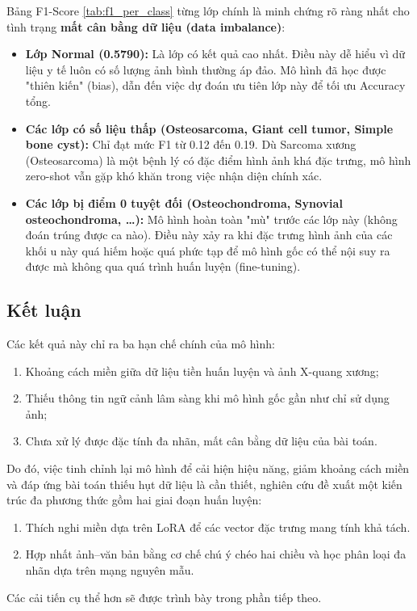 Bảng F1-Score \ref{tab:f1_per_class} từng lớp chính là minh chứng rõ ràng nhất cho tình trạng \textbf{mất cân bằng dữ liệu (data imbalance)}:
\begin{itemize}
    \item \textbf{Lớp Normal (0.5790):} Là lớp có kết quả cao nhất. Điều này dễ hiểu vì dữ liệu y tế luôn có số lượng ảnh bình thường áp đảo. Mô hình đã học được "thiên kiến" (bias), dẫn đến việc dự đoán ưu tiên lớp này để tối ưu Accuracy tổng.
    \item \textbf{Các lớp có số liệu thấp (Osteosarcoma, Giant cell tumor, Simple bone cyst):} Chỉ đạt mức F1 từ 0.12 đến 0.19. Dù Sarcoma xương (Osteosarcoma) là một bệnh lý có đặc điểm hình ảnh khá đặc trưng, mô hình zero-shot vẫn gặp khó khăn trong việc nhận diện chính xác.
    \item \textbf{Các lớp bị điểm 0 tuyệt đối (Osteochondroma, Synovial osteochondroma, \dots):} Mô hình hoàn toàn "mù" trước các lớp này (không đoán trúng được ca nào). Điều này xảy ra khi đặc trưng hình ảnh của các khối u này quá hiếm hoặc quá phức tạp để mô hình gốc có thể nội suy ra được mà không qua quá trình huấn luyện (fine-tuning).
\end{itemize}


\subsection{Kết luận}
    Các kết quả này chỉ ra ba hạn chế chính của mô hình:
        \begin{enumerate}
            \item Khoảng cách miền giữa dữ liệu tiền huấn luyện và ảnh X-quang xương;
            \item Thiếu thông tin ngữ cảnh lâm sàng khi mô hình gốc gần như chỉ sử dụng ảnh;
            \item Chưa xử lý được đặc tính đa nhãn, mất cân bằng dữ liệu của bài toán.
        \end{enumerate}
    Do đó, việc tinh chỉnh lại mô hình để cải hiện hiệu năng, giảm khoảng cách miền và đáp ứng bài toán thiếu hụt dữ liệu là cần thiết, 
    nghiên cứu đề xuất một kiến trúc đa phương thức gồm hai giai đoạn huấn luyện:
    \begin{enumerate}
        \item Thích nghi miền dựa trên LoRA để các vector đặc trưng mang tính khả tách.
        \item Hợp nhất ảnh–văn bản bằng cơ chế chú ý chéo hai chiều và học phân loại đa nhãn dựa trên mạng nguyên mẫu.
    \end{enumerate}
    Các cải tiến cụ thể hơn sẽ được trình bày trong phần tiếp theo.


